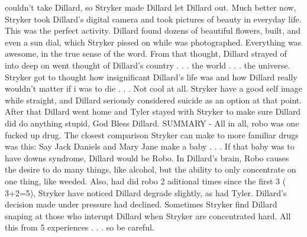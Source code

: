 \documentclass[12pt]{book}
\begin{document}
couldn't take Dillard, so Stryker made Dillard let Dillard out. Much better now, Stryker took Dillard's digital camera and took pictures of beauty in everyday life. This was the perfect activity. Dillard found dozens of beautiful flowers, built, and even a sun dial, which Stryker pissed on while was photographed. Everything was awesome, in the true sense of the word. From that thought, Dillard strayed of into deep on went thought of Dillard's country . . .  the world . . .  the universe. Stryker got to thought how insignificant Dillard's life was and how Dillard really wouldn't matter if i was to die . . .  Not cool at all. Stryker have a good self image while straight, and Dillard seriously considered suicide as an option at that point. After that Dillard went home and Tyler stayed with Stryker to make sure Dillard did do anything stupid, God Bless Dillard. SUMMARY - All in all, robo was one fucked up drug. The closest comparison Stryker can make to more familiar drugs was this: Say Jack Daniels and Mary Jane make a baby . . .  If that baby was to have downs syndrome, Dillard would be Robo. In Dillard's brain, Robo causes the desire to do many things, like alcohol, but the ability to only concentrate on one thing, like weeded. Also, had did robo 2 aditional times since the first 3 ( 3+2=5), Stryker have noticed Dillard degrade slightly, as had Tyler. Dillard's decision made under pressure had declined. Sometimes Stryker find Dillard snaping at those who interupt Dillard when Stryker are concentrated hard. All this from 5 experiences . . .  so be careful.
\end{document}
